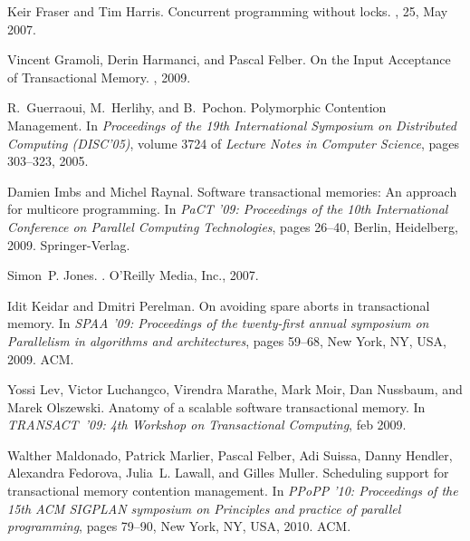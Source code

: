 \begin{thebibliography}{99}
{
Keir Fraser and Tim Harris.
\newblock Concurrent programming without locks.
, 25, May 2007.

Vincent Gramoli, Derin Harmanci, and Pascal Felber.
\newblock On the {I}nput {A}cceptance of {T}ransactional {M}emory.
, 2009.

R.~Guerraoui, M.~Herlihy, and B.~Pochon.
\newblock Polymorphic {C}ontention {M}anagement.
\newblock In {\em Proceedings of the 19th {I}nternational {S}ymposium on
  {D}istributed {C}omputing ({DISC}'05)}, volume 3724 of {\em Lecture Notes in
  Computer Science}, pages 303--323, 2005.










Damien Imbs and Michel Raynal.
\newblock Software transactional memories: An approach for multicore
  programming.
\newblock In {\em PaCT '09: Proceedings of the 10th International Conference on
  Parallel Computing Technologies}, pages 26--40, Berlin, Heidelberg, 2009.
  Springer-Verlag.

Simon~P. Jones.
.
\newblock O'Reilly Media, Inc., 2007.

Idit Keidar and Dmitri Perelman.
\newblock On avoiding spare aborts in transactional memory.
\newblock In {\em SPAA '09: Proceedings of the twenty-first annual symposium on
  Parallelism in algorithms and architectures}, pages 59--68, New York, NY,
  USA, 2009. ACM.



Yossi Lev, Victor Luchangco, Virendra Marathe, Mark Moir, Dan Nussbaum, and
  Marek Olszewski.
\newblock Anatomy of a scalable software transactional memory.
\newblock In {\em TRANSACT~'09: 4th Workshop on Transactional Computing}, feb
  2009.

Walther Maldonado, Patrick Marlier, Pascal Felber, Adi Suissa, Danny Hendler,
  Alexandra Fedorova, Julia~L. Lawall, and Gilles Muller.
\newblock Scheduling support for transactional memory contention management.
\newblock In {\em PPoPP '10: Proceedings of the 15th ACM SIGPLAN symposium on
  Principles and practice of parallel programming}, pages 79--90, New York, NY,
  USA, 2010. ACM.

}
\end{thebibliography}
